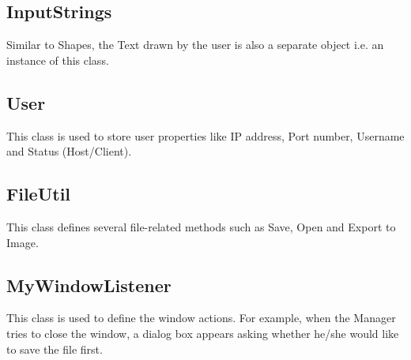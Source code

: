 \subsection{InputStrings}
Similar to Shapes, the Text drawn by the user is also a separate object i.e. an instance of this class.

\subsection{User}
This class is used to store user properties like IP address, Port number, Username and Status (Host/Client).

\subsection{FileUtil}
This class defines several file-related methods such as Save, Open and Export to Image.

\subsection{MyWindowListener}
This class is used to define the window actions. For example, when the Manager tries to close the window, a dialog box appears asking whether he/she would like to save the file first.



